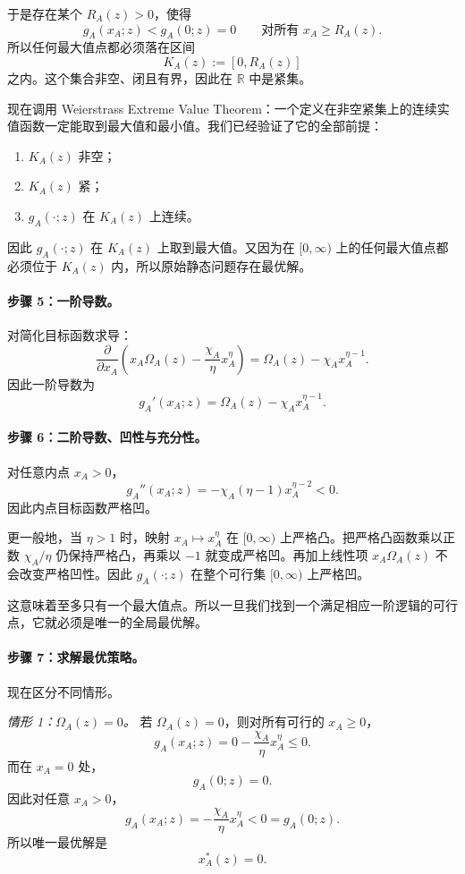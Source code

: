 于是存在某个 $R_A(z)>0$，使得
\[
g_A(x_A;z)<g_A(0;z)=0
\qquad\text{对所有 }x_A\ge R_A(z).
\]
所以任何最大值点都必须落在区间
\[
K_A(z):=[0,R_A(z)]
\]
之内。这个集合非空、闭且有界，因此在 $\mathbb R$ 中是紧集。

现在调用 Weierstrass Extreme Value Theorem：一个定义在非空紧集上的连续实值函数一定能取到最大值和最小值。我们已经验证了它的全部前提：
\begin{enumerate}
    \item $K_A(z)$ 非空；
    \item $K_A(z)$ 紧；
    \item $g_A(\cdot;z)$ 在 $K_A(z)$ 上连续。
\end{enumerate}
因此 $g_A(\cdot;z)$ 在 $K_A(z)$ 上取到最大值。又因为在 $[0,\infty)$ 上的任何最大值点都必须位于 $K_A(z)$ 内，所以原始静态问题存在最优解。

\paragraph{步骤 5：一阶导数。}
对简化目标函数求导：
\[
\frac{\partial}{\partial x_A}
\left(
 x_A\Omega_A(z)-\frac{\chi_A}{\eta}x_A^\eta
\right)
=
\Omega_A(z)-\chi_Ax_A^{\eta-1}.
\]
因此一阶导数为
\begin{equation}
g_A'(x_A;z)=\Omega_A(z)-\chi_Ax_A^{\eta-1}.
\label{eq:p2A_derivative}
\end{equation}

\paragraph{步骤 6：二阶导数、凹性与充分性。}
对任意内点 $x_A>0$，
\[
g_A''(x_A;z)=-\chi_A(\eta-1)x_A^{\eta-2}<0.
\]
因此内点目标函数严格凹。

更一般地，当 $\eta>1$ 时，映射 $x_A\mapsto x_A^\eta$ 在 $[0,\infty)$ 上严格凸。把严格凸函数乘以正数 $\chi_A/\eta$ 仍保持严格凸，再乘以 $-1$ 就变成严格凹。再加上线性项 $x_A\Omega_A(z)$ 不会改变严格凹性。因此 $g_A(\cdot;z)$ 在整个可行集 $[0,\infty)$ 上严格凹。

这意味着至多只有一个最大值点。所以一旦我们找到一个满足相应一阶逻辑的可行点，它就必须是唯一的全局最优解。

\paragraph{步骤 7：求解最优策略。}
现在区分不同情形。

\textit{情形 1：$\Omega_A(z)=0$。}
若 $\Omega_A(z)=0$，则对所有可行的 $x_A\ge 0$，
\[
g_A(x_A;z)=0-\frac{\chi_A}{\eta}x_A^\eta\le 0.
\]
而在 $x_A=0$ 处，
\[
g_A(0;z)=0.
\]
因此对任意 $x_A>0$，
\[
g_A(x_A;z)=-\frac{\chi_A}{\eta}x_A^\eta<0=g_A(0;z).
\]
所以唯一最优解是
\[
x_A^*(z)=0.
\]

